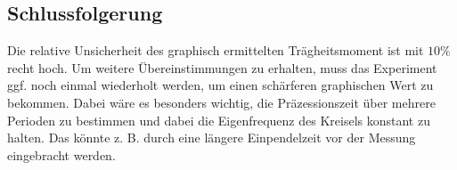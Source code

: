 \subsection{Schlussfolgerung}

Die relative Unsicherheit des graphisch ermittelten Trägheitsmoment ist mit $10\%$ recht hoch.
Um weitere Übereinstimmungen zu erhalten, muss das Experiment ggf. noch einmal wiederholt werden, um einen schärferen graphischen Wert zu bekommen.
Dabei wäre es besonders wichtig, die Präzessionszeit über mehrere Perioden zu bestimmen und dabei die Eigenfrequenz des Kreisels konstant zu halten.
Das könnte z. B. durch eine längere Einpendelzeit vor der Messung eingebracht werden.
